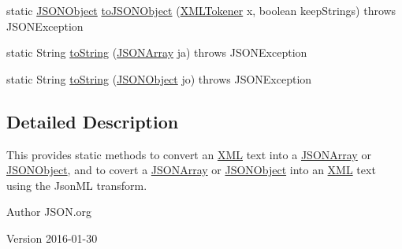 \begin{DoxyCompactItemize}
\item 
static \hyperlink{classorg_1_1json_1_1JSONObject}{J\-S\-O\-N\-Object} \hyperlink{classorg_1_1json_1_1JSONML_a79a799675cf7c900eea8596efef305e3}{to\-J\-S\-O\-N\-Object} (\hyperlink{classorg_1_1json_1_1XMLTokener}{X\-M\-L\-Tokener} x, boolean keep\-Strings)  throws J\-S\-O\-N\-Exception 
\item 
static String \hyperlink{classorg_1_1json_1_1JSONML_aeb4921c45210936fbcd3a527e1df88fd}{to\-String} (\hyperlink{classorg_1_1json_1_1JSONArray}{J\-S\-O\-N\-Array} ja)  throws J\-S\-O\-N\-Exception 
\item 
static String \hyperlink{classorg_1_1json_1_1JSONML_aa436f0b8577f68314e12f23f803437c2}{to\-String} (\hyperlink{classorg_1_1json_1_1JSONObject}{J\-S\-O\-N\-Object} jo)  throws J\-S\-O\-N\-Exception 
\end{DoxyCompactItemize}


\subsection{Detailed Description}
This provides static methods to convert an \hyperlink{classorg_1_1json_1_1XML}{X\-M\-L} text into a \hyperlink{classorg_1_1json_1_1JSONArray}{J\-S\-O\-N\-Array} or \hyperlink{classorg_1_1json_1_1JSONObject}{J\-S\-O\-N\-Object}, and to covert a \hyperlink{classorg_1_1json_1_1JSONArray}{J\-S\-O\-N\-Array} or \hyperlink{classorg_1_1json_1_1JSONObject}{J\-S\-O\-N\-Object} into an \hyperlink{classorg_1_1json_1_1XML}{X\-M\-L} text using the Json\-M\-L transform.

\begin{DoxyAuthor}{Author}
J\-S\-O\-N.\-org 
\end{DoxyAuthor}
\begin{DoxyVersion}{Version}
2016-\/01-\/30 
\end{DoxyVersion}


